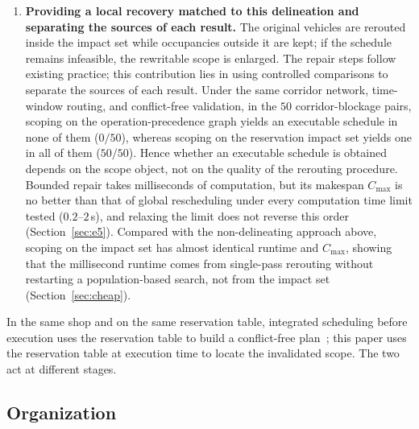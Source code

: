 \documentclass[manuscript,screen,review]{acmart}
\newcommand{\NPairs}{50}
\newcommand{\FeasRone}{0/\NPairs}            %
\newcommand{\FeasRtwo}{\NPairs/\NPairs}      %
\begin{document}
\begin{enumerate}[label=\textbf{C\arabic*.},leftmargin=2.2em,itemsep=0.4em]
\item \textbf{Providing a local recovery matched to this delineation and separating the sources of each result.}
The original vehicles are rerouted inside the impact set while occupancies outside it are kept; if the schedule remains infeasible, the rewritable scope is enlarged.
The repair steps follow existing practice; this contribution lies in using controlled comparisons to separate the sources of each result.
Under the same corridor network, time-window routing, and conflict-free validation, in the \(\NPairs\) corridor-blockage pairs,
scoping on the operation-precedence graph yields an executable schedule in none of them (\(\FeasRone\)), whereas scoping on the reservation impact set yields one in all of them (\(\FeasRtwo\)).
Hence whether an executable schedule is obtained depends on the scope object, not on the quality of the rerouting procedure.
Bounded repair takes milliseconds of computation, but its makespan \(C_{\max}\) is no better than that of global rescheduling under every computation time limit tested (\(0.2\)--\(2\)\,s),
and relaxing the limit does not reverse this order (Section~\ref{sec:e5}).
Compared with the non-delineating approach above, scoping on the impact set has almost identical runtime and \(C_{\max}\), showing that the millisecond runtime comes from single-pass rerouting
without restarting a population-based search, not from the impact set (Section~\ref{sec:cheap}).
\end{enumerate}

In the same shop and on the same reservation table, integrated scheduling before execution uses the reservation table to build a conflict-free plan~\cite{vanos2026exact,li2026framework,sun2023integrated}; this paper uses the reservation table at execution time to locate the invalidated scope. The two act at different stages.

\subsection{Organization}
\end{document}
